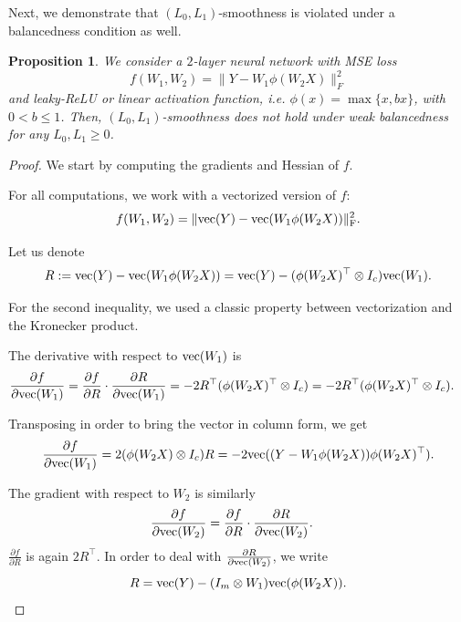 \documentclass[a4paper,11pt]{article}
\newcommand{\1}{\mathbbm{1}}
\theoremstyle{plain}
\newtheorem{proposition}[theorem]{Proposition}
\begin{document}
Next, we demonstrate that $(L_0, L_1)$-smoothness is violated under a balancedness condition as well. 


\begin{proposition}
\label{prop:counterexample2}
    We consider a $2$-layer neural network with MSE loss
    \begin{equation*}
        f(W_1,W_2) = \|Y- W_1 \phi(W_2 X)\|_F^2
    \end{equation*}
    and leaky-ReLU or linear activation function, i.e. $\phi(x)=\max \lbrace x, bx \rbrace$, with $0<b\leq 1$. Then, $(L_0,L_1)$-smoothness does not hold under weak balancedness for any $L_0,L_1 \geq 0$.
\end{proposition}

\begin{proof}
We start by computing the gradients and Hessian of $f$.

For all computations, we work with a vectorized version of $f$:
\begin{equation*}
    f(W_1,W_2)=\|\textnormal{vec}(Y)-\textnormal{vec}(W_1 \phi(W_2 X))\|_{\rm F}^2.
\end{equation*}

Let us denote $$R := \textnormal{vec}(Y)-\textnormal{vec}(W_1 \phi(W_2 X)) = \textnormal{vec}(Y) - (\phi(W_2 X)^\top \otimes I_c) \textnormal{vec}(W_1). $$

For the second inequality, we used a classic property between vectorization and the Kronecker product.

The derivative with respect to $\textnormal{vec}(W_1)$ is 
\begin{align*}
    &\frac{\partial f}{\partial \textnormal{vec}(W_1)} =  
  \frac{\partial f}{\partial R} \cdot \frac{\partial R}{\partial \textnormal{vec}(W_1) }  = -2 R^\top (\phi(W_2 X)^\top \otimes I_c) = -2 R^\top (\phi(W_2 X)^\top \otimes I_c).
\end{align*}

Transposing in order to bring the vector in column form, we get
\begin{equation}
\label{eq:fisrt_grad_of_2layer}
    \frac{\partial f}{\partial \textnormal{vec}(W_1)} = 2 (\phi(W_2 X) \otimes I_c) R = - 2 \textnormal{vec}((Y-W_1 \phi(W_2 X)) \phi(W_2 X)^\top).
\end{equation}

The gradient with respect to $W_2$ is similarly
\begin{align*}
   &\frac{\partial f}{\partial \textnormal{vec}(W_2)} = \frac{\partial f}{\partial R} \cdot \frac{\partial R}{\partial \textnormal{vec}(W_2) }. 
\end{align*}
$\frac{\partial f}{\partial R}$ is again $2 R^\top$. In order to deal with $\frac{\partial R}{\partial \textnormal{vec}(W_2) }$, we write
\begin{equation*}
    R = \textnormal{vec}(Y) - (I_m \otimes W_1) \textnormal{vec}(\phi(W_2 X)).
\end{equation*}


\end{proof}
\end{document}
